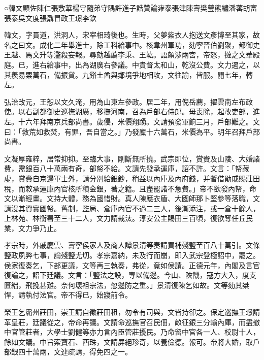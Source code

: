 
\begin{pinyinscope}
○韓文顧佐陳仁張敷華楊守隨弟守隅許進子誥贊論雍泰張津陳壽樊瑩熊繡潘蕃胡富張泰吳文度張鼐冒政王璟李欽

韓文，字貫道，洪洞人，宋宰相琦後也。生時，父夢紫衣人抱送文彥博至其家，故名之曰文。成化二年舉進士，除工科給事中。核韋州軍功，劾寧晉伯劉聚，都御史王越、馬文升等濫殺妄報。尋劾越薦李秉、王竑。語頗涉兩宮，帝怒，撻之文華殿庭。已，進右給事中，出為湖廣右參議。中貴督太和山，乾沒公費。文力遏之，以其羨易粟萬石，備振貸。九谿土酋與鄰境爭地相攻，文往諭，皆服。閱七年，轉左。

弘治改元，王恕以文久淹，用為山東左參政。居二年，用倪岳薦，擢雲南左布政使。以右副都御史巡撫湖廣，移撫河南，召為戶部右侍郎。母喪除，起改吏部，進左。十六年拜南京兵部尚書。歲侵，米價翔踴。文請預發軍餉三月，戶部難之。文曰：「救荒如救焚，有罪，吾自當之。」乃發廩十六萬石，米價為平。明年召拜戶部尚書。

文凝厚雍粹，居常抑抑。至臨大事，剛斷無所撓。武宗即位，賞賚及山陵、大婚諸費，需銀百八十萬兩有奇，部帑不給。文請先發承運庫，詔不許。文言：「帑藏虛，賞賚自京邊軍士外，請分別給銀鈔，稍益以內庫及內府錢，并暫借勛戚賜莊田稅，而敕承運庫內官核所積金銀，著之籍。且盡罷諸不急費。」帝不欲發內帑，命文以漸經畫。文持大體，務為國惜財。真人陳應衣盾、大國師那卜堅參等落職，文請沒其資實國帑。舊制，監局、倉庫內官不過二三人，後漸添注，或一倉十餘人，上林苑、林衡署至三十二人，文力請裁汰。淳安公主賜田三百頃，復欲奪任丘民業，文力爭乃止。

孝宗時，外戚慶雲、壽寧侯家人及商人譚景清等奏請買補殘鹽至百八十萬引。文條鹽政夙弊七事，論殘鹽尤切。孝宗嘉納，未及行而崩，即入武宗登極詔中，罷之。侯家復奏乞，下部更議，文等再三執奏，弗從，竟如侯請。正德元年，內閣及言官復論之，詔下廷議。文言：「鹽法之設，專以備邊。今山、陜饑，寇方大入，度支匱絀，飛挽甚難。奈何壞祖宗法，忽邊防之重。」景清復陳乞如故。文等劾其桀悍，請執付法官。帝不得已，始寢前令。

榮王乞霸州莊田，崇王請自徵莊田租，勿令有司與，文皆持卻之。保定巡撫王璟請革皇莊，廷議從之，帝命再議。文請命巡撫官召民佃，畝征銀三分輸內庫，而盡撤中官管莊者，大學士劉健等亦力言內臣管莊擾民。乃命留中官各一人、校尉十人，餘如文議。中旨索寶石、西珠，文請屏絕珍奇，以養儉德。報可。帝將大婚，取戶部銀四十萬兩，文連疏請，得免四之一。


\end{pinyinscope}
